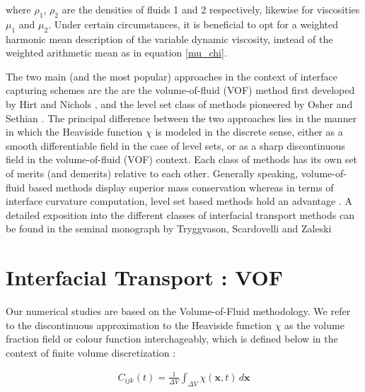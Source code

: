 where $\rho_{1}$, $\rho_{2}$ are the densities of fluids 1 and 2 respectively, 
likewise for viscosities $\mu_{1}$ and $\mu_{2}$. Under certain circumstances, 
it is beneficial to opt for a weighted harmonic mean description of the 
variable dynamic viscosity, instead of the weighted arithmetic mean as in equation \ref{mu_chi}. 


The two main (and the most popular)
approaches in the context of interface capturing schemes are the 
are the volume-of-fluid (VOF) method first developed by Hirt and Nichols \cite{hirt1981volume}, 
and the level set class of methods pioneered by Osher and Sethian \cite{osher1988fronts}.
The principal difference between the two approaches lies in the manner in which
the Heaviside function $\chi$ is modeled in the discrete sense, 
either as a smooth differentiable field in
the case of level sets, or as a sharp discontinuous field in the volume-of-fluid (VOF) context.  
Each class of methods has its own set of merits (and demerits) relative to each other. 
Generally speaking, volume-of-fluid based methods display superior mass conservation
whereas in terms of interface curvature computation, level set based methods hold an advantage
 . 
A detailed exposition into the different classes of interfacial transport
methods can be found in the seminal monograph by Tryggvason, Scardovelli and Zaleski \cite{zaleskibook}


\section{Interfacial Transport : VOF}
Our numerical studies are based on the Volume-of-Fluid methodology. 
We refer to the discontinuous approximation to the Heaviside function
$\chi$ as the volume fraction field or colour function interchageably, which 
is defined below in the context of finite volume discretization : 

\begin{align} 
	C_{ijk}\left(t\right) = \frac{1}{\Delta V} \displaystyle\int_{\Delta V} \chi(\boldsymbol{x},t) \,d\boldsymbol x 
\end{align}

